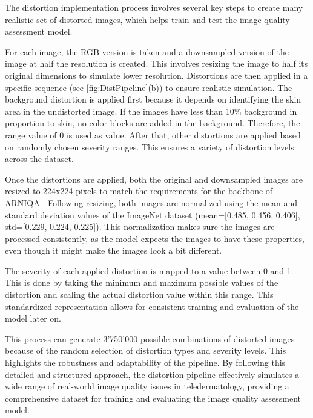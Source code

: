 The distortion implementation process involves several key steps to create many realistic set of distorted images, which helps train and test the image quality assessment model. \par
\vspace{\baselineskip}
\noindent
For each image, the RGB version is taken and a downsampled version of the image at half the resolution is created. This involves resizing the image to half its original dimensions to simulate lower resolution. Distortions are then applied in a specific sequence (see \autoref{fig:DistPipeline}(b)) to ensure realistic simulation. The background distortion is applied first because it depends on identifying the skin area in the undistorted image. If the images have less than 10\% background in proportion to skin, no color blocks are added in the background. Therefore, the range value of 0 is used as value.  After that, other distortions are applied based on randomly chosen severity ranges. This ensures a variety of distortion levels across the dataset. \par
\vspace{\baselineskip}
\noindent
Once the distortions are applied, both the original and downsampled images are resized to 224x224 pixels to match the requirements for the backbone of ARNIQA \autocite{ARNIQA}. Following resizing, both images are normalized using the mean and standard deviation values of the ImageNet dataset (mean=[0.485, 0.456, 0.406], std=[0.229, 0.224, 0.225]). This normalization makes sure the images are processed consistently, as the model expects the images to have these properties, even though it might make the images look a bit different. \par
\vspace{\baselineskip}
\noindent
The severity of each applied distortion is mapped to a value between 0 and 1. This is done by taking the minimum and maximum possible values of the distortion and scaling the actual distortion value within this range. This standardized representation allows for consistent training and evaluation of the model later on. \par
\vspace{\baselineskip}
\noindent
This process can generate 3'750'000 possible combinations of distorted images because of the random selection of distortion types and severity levels. This highlights the robustness and adaptability of the pipeline. By following this detailed and structured approach, the distortion pipeline effectively simulates a wide range of real-world image quality issues in teledermatology, providing a comprehensive dataset for training and evaluating the image quality assessment model. \par

